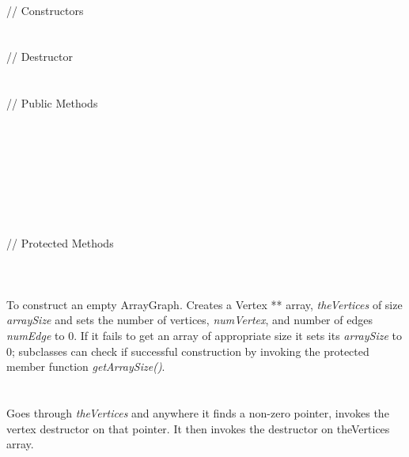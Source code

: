   \\
\indent\indent // Constructors  \\
\indent{}  \\ \\
\indent\indent // Destructor  \\
\indent{}  \\ \\
\indent\indent // Public Methods   \\
\indent{}  \\
\indent{} \\
\indent{} \\
\indent{} \\
\indent{} \\
\indent{} \\
\indent{} \\ \\
\indent\indent // Protected Methods \\
\indent{} \\


  \\
  \\
To construct an empty ArrayGraph. Creates a Vertex ** array, {\em
theVertices} of size {\em arraySize} and sets the number of vertices,
{\em numVertex}, and number of edges {\em numEdge} to $0$. If it fails
to get an array of appropriate size it sets its {\em arraySize} to
$0$; subclasses can check if successful construction by invoking the
protected member function {\em getArraySize()}. \\

  \\
  \\
Goes through {\em theVertices} and anywhere it finds a non-zero pointer,
invokes the vertex destructor on that pointer. It then invokes the
destructor on theVertices array. \\



